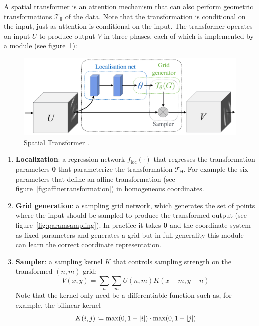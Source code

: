 A spatial transformer \cite{jaderberg2015spatial} is an attention mechanism that can also perform geometric transformations \(\mathcal{T}_{\bm{\theta}}\) of the data.
%
Note that the transformation is conditional on the input, just as attention is conditional on the input.
%
The transformer operates on input \(U\) to produce output \(V\) in three phases, each of which is implemented by a module (see figure~\ref{fig:spacetransformer}): 
\begin{figure}[!htbp]
    \centering
    \includegraphics[width=.49\textwidth]{figures/neural_networks/space_transformer.png}
    \caption{Spatial Transformer \cite{jaderberg2015spatial}.}\label{fig:spacetransformer}
\end{figure}
\begin{mdframed}
    \begin{enumerate}
        \item \textbf{Localization}: a regression network \(f_{\text{loc}}(\cdot)\) that regresses the transformation parameters \(\bm{\theta}\) that parameterize the transformation \(\mathcal{T}_{\bm{\theta}}\). For example the six parameters that define an affine transformation (see figure~\ref{fig:affinetransformation}) in homogeneous coordinates.
        \item \textbf{Grid generation}: a sampling grid network, which generates the set of points where the input should be sampled to produce the transformed output (see figure~\ref{fig:paramsampling}). In practice it takes \(\bm{\theta}\) and the coordinate system as fixed parameters and generates a grid but in full generality this module can learn the correct coordinate representation.
        \item \textbf{Sampler}: a sampling kernel \(K\) that controls sampling strength on the transformed \((n,m)\) grid:
        \begin{equation*}
            V(x,y) = \sum_n \sum_m U(n,m) K(x-m, y-n)
        \end{equation*}
        Note that the kernel only need be a differentiable function such as, for example, the bilinear kernel \begin{equation*}
            K(i, j) \coloneqq \max(0, 1-\abs{i})\cdot \max(0, 1- \abs{j})
        \end{equation*}
    \end{enumerate}
\end{mdframed}

